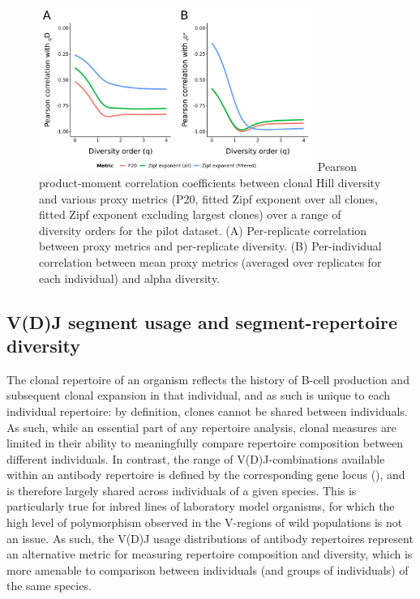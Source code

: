 \begin{figure}
\centering
\begin{subfigure}{0em}
\label{fig:igseq-pilot-clone-diversity-metrics-cor-rep}
\end{subfigure}
\begin{subfigure}{0em}
\label{fig:igseq-pilot-clone-diversity-metrics-cor-alpha}
\end{subfigure}
\includegraphics[width = 0.8\textwidth]{_Figures/png/pilot-clone-diversity-metrics-cor}
{Pearson product-moment correlation coefficients between clonal Hill diversity and various proxy metrics (P20, fitted Zipf exponent over all clones, fitted Zipf exponent excluding largest clones) over a range of diversity orders for the \igseq pilot dataset. (A) Per-replicate correlation between proxy metrics and per-replicate diversity. (B) Per-individual correlation between mean proxy metrics (averaged over replicates for each individual) and alpha diversity.}
\label{fig:igseq-pilot-clone-diversity-metrics-cor}
\end{figure}


\subsection{V(D)J segment usage and segment-repertoire diversity}
\label{sec:igseq_pilot_segments}

The clonal repertoire of an organism reflects the history of \naive B-cell production and subsequent clonal expansion in that individual, and as such is unique to each individual repertoire: by definition, clones cannot be shared between individuals. As such, while an essential part of any repertoire analysis, clonal measures are limited in their ability to meaningfully compare repertoire composition between different individuals. In contrast, the range of V(D)J-combinations available within an antibody repertoire is defined by the corresponding gene locus (), and is therefore largely shared across individuals of a given species. This is particularly true for inbred lines of laboratory model organisms, for which the high level of polymorphism observed in the V-regions of wild populations \parencite{gadalamaria2015tigger,corcoran2016igdiscover} is not an issue. As such, the V(D)J usage distributions of antibody repertoires represent an alternative metric for measuring repertoire composition and diversity, which is more amenable to comparison between individuals (and groups of individuals) of the same species.

